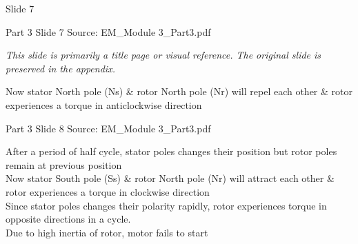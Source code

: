 \documentclass[11pt,a4paper]{article}
\begin{document}
\begin{mdframed}[roundcorner=9pt,backgroundcolor=white,linecolor=anthOrange,linewidth=1pt,innerleftmargin=12pt,innerrightmargin=12pt,innertopmargin=10pt,innerbottommargin=10pt,skipabove=8pt,skipbelow=10pt]
{\HeadingFont\fontsize{15}{18}\selectfont\color{anthDark}Slide 7\par}
{\color{anthMid}\small Part 3 \textbullet{} Slide 7 \textbullet{} Source: EM\_Module 3\_Part3.pdf\par}
\vspace{0.5em}
{\small
\textit{This slide is primarily a title page or visual reference. The original slide is preserved in the appendix.}

}
\end{mdframed}

\begin{mdframed}[roundcorner=9pt,backgroundcolor=white,linecolor=anthBlue,linewidth=1pt,innerleftmargin=12pt,innerrightmargin=12pt,innertopmargin=10pt,innerbottommargin=10pt,skipabove=8pt,skipbelow=10pt]
{\HeadingFont\fontsize{15}{18}\selectfont\color{anthDark}Now stator North pole (Ns) \& rotor North pole (Nr) will repel each other \& rotor experiences a torque in anticlockwise direction\par}
{\color{anthMid}\small Part 3 \textbullet{} Slide 8 \textbullet{} Source: EM\_Module 3\_Part3.pdf\par}
\vspace{0.5em}
{\small
\textcolor{anthBlue}{\textbullet}\hspace{0.65em}After a period of half cycle, stator poles changes their position but rotor poles remain at previous position\\
\textcolor{anthBlue}{\textbullet}\hspace{0.65em}Now stator South pole (Ss) \& rotor North pole (Nr) will attract each other \& rotor experiences a torque in clockwise direction\\
\textcolor{anthBlue}{\textbullet}\hspace{0.65em}Since stator poles changes their polarity rapidly, rotor experiences torque in opposite directions in a cycle.\\
\textcolor{anthBlue}{\textbullet}\hspace{0.65em}Due to high inertia of rotor, motor fails to start\\

}
\end{mdframed}
\end{document}

